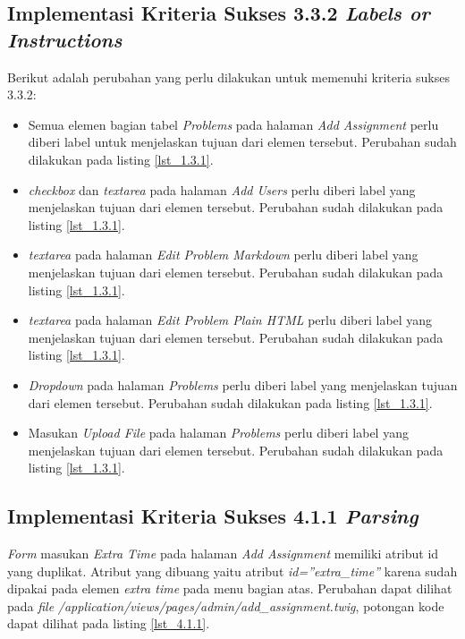\subsection{Implementasi Kriteria Sukses 3.3.2 \textit{Labels or Instructions}}
\label{subsec:implementasi_A_3.3.2}

Berikut adalah perubahan yang perlu dilakukan untuk memenuhi kriteria sukses 3.3.2:

\begin{itemize}
	\item Semua elemen bagian tabel \textit{Problems} pada halaman \textit{Add Assignment} perlu diberi label untuk menjelaskan tujuan dari elemen tersebut. Perubahan sudah dilakukan pada listing \ref{lst_1.3.1}.
	
	\item \textit{checkbox} dan \textit{textarea} pada halaman \textit{Add Users} perlu diberi label yang menjelaskan tujuan dari elemen tersebut. Perubahan sudah dilakukan pada listing \ref{lst_1.3.1}.
	
	\item \textit{textarea} pada halaman \textit{Edit Problem Markdown} perlu diberi label yang menjelaskan tujuan dari elemen tersebut. Perubahan sudah dilakukan pada listing \ref{lst_1.3.1}.
	
	\item \textit{textarea} pada halaman \textit{Edit Problem Plain HTML} perlu diberi label yang menjelaskan tujuan dari elemen tersebut. Perubahan sudah dilakukan pada listing \ref{lst_1.3.1}.
	
	\item \textit{Dropdown} pada halaman \textit{Problems} perlu diberi label yang menjelaskan tujuan dari elemen tersebut. Perubahan sudah dilakukan pada listing \ref{lst_1.3.1}.
	
	\item Masukan \textit{Upload File} pada halaman \textit{Problems} perlu diberi label yang menjelaskan tujuan dari elemen tersebut. Perubahan sudah dilakukan pada listing \ref{lst_1.3.1}.
\end{itemize}

\subsection{Implementasi Kriteria Sukses 4.1.1 \textit{Parsing}}
\label{subsec:implementasi_A_4.1.1}

\textit{Form} masukan \textit{Extra Time} pada halaman \textit{Add Assignment} memiliki atribut id yang duplikat. Atribut yang dibuang yaitu atribut \textit{id=''extra\_time''} karena sudah dipakai pada elemen \textit{extra time} pada menu bagian atas. Perubahan dapat dilihat pada \textit{file} \textit{/application/views/pages/admin/add\_assignment.twig}, potongan kode dapat dilihat pada listing \ref{lst_4.1.1}.

